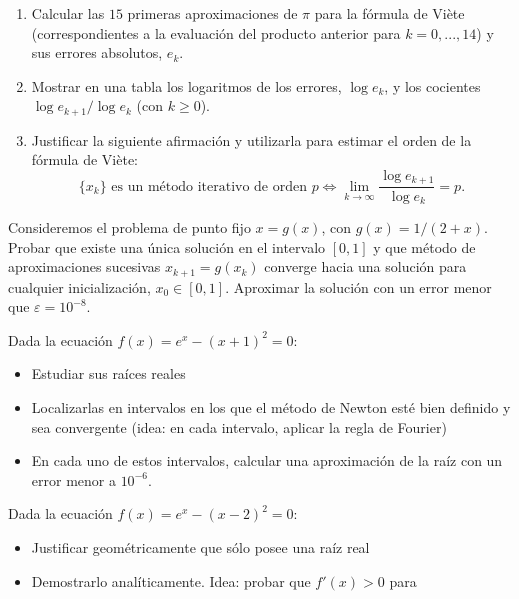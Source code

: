 \documentclass[11pt]{article}
\begin{document}
\begin{problemas}
\begin{problema}
    \begin{enumerate}
    \item Calcular las $15$ primeras aproximaciones de $\pi$ para la
      fórmula de Viète (correspondientes a la evaluación del producto
      anterior para $k=0,...,14$) y sus errores absolutos, $e_k$.
    \item Mostrar en una tabla los logaritmos de los errores, $\log
      e_k$, y los cocientes $\log e_{k+1}/\log
      e_{k}$ (con $k\ge 0$).
    \item Justificar la siguiente afirmación y utilizarla para estimar
      el orden de la fórmula de Viète:
      \begin{equation*}
        \label{eq:1}
        \{x_k\} \text{ es un método iterativo de orden } p 
        \Leftrightarrow \lim_{k\to\infty} \frac{\log e_{k+1}}{\log e_{k}}=p.
      \end{equation*}
    \end{enumerate}
  \end{problema}
  \begin{problema}
    Consideremos el problema de punto fijo $x=g(x)$, con
    $g(x)=1/(2+x)$.  Probar que existe una única solución en el
    intervalo $[0,1]$ y que método de aproximaciones sucesivas
    $x_{k+1}=g(x_k)$ converge hacia una solución para cualquier
    inicialización, $x_0\in[0,1]$. Aproximar la
    solución con un error menor que $\varepsilon=10^{-8}$.
  \end{problema}
  \begin{problema}
    Dada la ecuación $f(x)=e^x-(x+1)^2=0$:
    \begin{itemize}
    \item Estudiar sus raíces reales
    \item Localizarlas en intervalos en los que el método de Newton
      esté bien definido y sea convergente (idea: en cada intervalo,
      aplicar la regla de Fourier)
    \item En cada uno de estos intervalos, calcular una aproximación
      de la raíz con un error menor a $10^{-6}$.
    \end{itemize}
  \end{problema}
  \begin{problema}
    Dada la ecuación $f(x)=e^x-(x-2)^2=0$:
    \begin{itemize}
    \item Justificar geométricamente que sólo posee una raíz real
    \item Demostrarlo analíticamente. Idea: probar que $f'(x)>0$ para

\end{itemize}
\end{problema}
\end{problemas}
\end{document}
